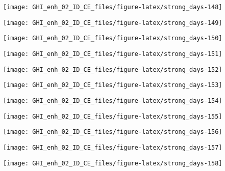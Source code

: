 \documentclass[
  10pt,
  a4paper,oneside]{article}
\begin{document}
\begin{center}\texttt{[image: GHI\_enh\_02\_ID\_CE\_files/figure-latex/strong\_days-148]} \end{center}

\begin{center}\texttt{[image: GHI\_enh\_02\_ID\_CE\_files/figure-latex/strong\_days-149]} \end{center}

\begin{center}\texttt{[image: GHI\_enh\_02\_ID\_CE\_files/figure-latex/strong\_days-150]} \end{center}

\begin{center}\texttt{[image: GHI\_enh\_02\_ID\_CE\_files/figure-latex/strong\_days-151]} \end{center}

\begin{center}\texttt{[image: GHI\_enh\_02\_ID\_CE\_files/figure-latex/strong\_days-152]} \end{center}

\begin{center}\texttt{[image: GHI\_enh\_02\_ID\_CE\_files/figure-latex/strong\_days-153]} \end{center}

\begin{center}\texttt{[image: GHI\_enh\_02\_ID\_CE\_files/figure-latex/strong\_days-154]} \end{center}

\begin{center}\texttt{[image: GHI\_enh\_02\_ID\_CE\_files/figure-latex/strong\_days-155]} \end{center}

\begin{center}\texttt{[image: GHI\_enh\_02\_ID\_CE\_files/figure-latex/strong\_days-156]} \end{center}

\begin{center}\texttt{[image: GHI\_enh\_02\_ID\_CE\_files/figure-latex/strong\_days-157]} \end{center}

\begin{center}\texttt{[image: GHI\_enh\_02\_ID\_CE\_files/figure-latex/strong\_days-158]} \end{center}
\end{document}

